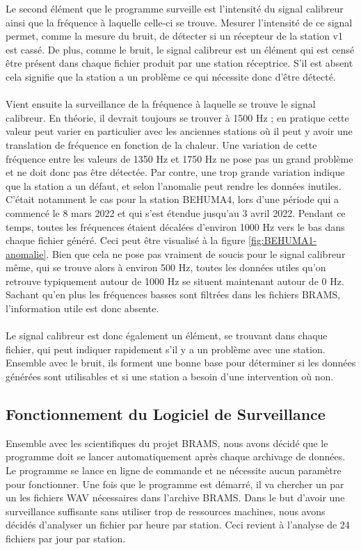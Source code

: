 \documentclass[11pt]{article}
\begin{document}
Le second élément que le programme surveille est l'intensité du signal calibreur ainsi que la fréquence à laquelle celle-ci se trouve.
Mesurer l'intensité de ce signal permet, comme la mesure du bruit, de détecter si un récepteur de la station v1 est cassé.
De plus, comme le bruit, le signal calibreur est un élément qui est censé être présent dans chaque fichier produit par une station réceptrice.
S'il est absent cela signifie que la station a un problème ce qui nécessite donc d'être détecté.\\
\\
Vient ensuite la surveillance de la fréquence à laquelle se trouve le signal calibreur.
En théorie, il devrait toujours se trouver à 1500 Hz ; en pratique cette valeur peut varier en particulier avec les anciennes stations où il peut y avoir une translation de fréquence en fonction de la chaleur.
Une variation de cette fréquence entre les valeurs de 1350 Hz et 1750 Hz ne pose pas un grand problème et ne doit donc pas être détectée.
Par contre, une trop grande variation indique que la station a un défaut, et selon l'anomalie peut rendre les données inutiles.
C'était notamment le cas pour la station BEHUMA4, lors d'une période qui a commencé le 8 mars 2022 et qui s'est étendue jusqu'au 3 avril 2022.
Pendant ce temps, toutes les fréquences étaient décalées d'environ 1000 Hz vers le bas dans chaque fichier généré.
Ceci peut être visualisé à la figure \ref{fig:BEHUMA1-anomalie}.
Bien que cela ne pose pas vraiment de soucis pour le signal calibreur même, qui se trouve alors à environ 500 Hz, toutes les données utiles qu'on retrouve typiquement autour de 1000 Hz se situent maintenant autour de 0 Hz.
Sachant qu'en plus les fréquences basses sont filtrées dans les fichiers BRAMS, l'information utile est donc absente.\\
\\
Le signal calibreur est donc également un élément, se trouvant dans chaque fichier, qui peut indiquer rapidement s'il y a un problème avec une station.
Ensemble avec le bruit, ils forment une bonne base pour déterminer si les données générées sont utilisables et si une station a besoin d'une intervention où non.

\subsection{Fonctionnement du Logiciel de Surveillance}

Ensemble avec les scientifiques du projet BRAMS, nous avons décidé que le programme doit se lancer automatiquement après chaque archivage de données.
Le programme se lance en ligne de commande et ne nécessite aucun paramètre pour fonctionner.
Une fois que le programme est démarré, il va chercher un par un les fichiers WAV nécessaires dans l'archive BRAMS.
Dans le but d'avoir une surveillance suffisante sans utiliser trop de ressources machines, nous avons décidés d'analyser un fichier par heure par station.
Ceci revient à l'analyse de 24 fichiers par jour par station.
\end{document}
